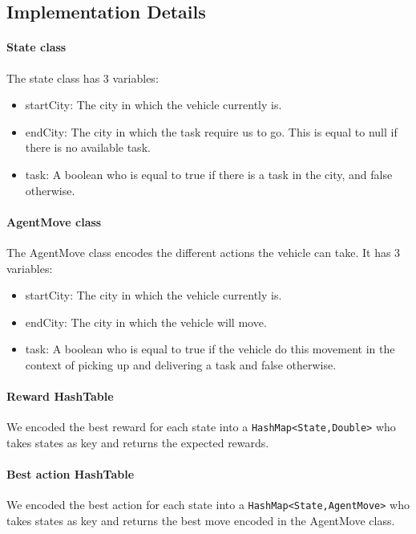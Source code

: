 \documentclass[11pt]{article}
\begin{document}
\subsection{Implementation Details}
\paragraph{State class} The state class has 3 variables:
\begin{itemize}
  \item startCity: The city in which the vehicle currently is.  
  \item endCity: The city in which the task require us to go. This is equal to null if there is no available task.
  \item task: A boolean who is equal to true if there is a task in the city, and false otherwise.
\end{itemize}

\paragraph{AgentMove class} The AgentMove class encodes the different actions the vehicle can take. It has 3 variables:
\begin{itemize}
  \item startCity: The city in which the vehicle currently is.
  \item endCity: The city in which the vehicle will move.
  \item task: A boolean who is equal to true if the vehicle do this movement in the context of picking up and delivering a task and false otherwise.
\end{itemize}

\paragraph{Reward HashTable} We encoded the best reward for each state into a \lstinline{HashMap<State,Double>} who takes states as key and returns the expected rewards.

\paragraph{Best action HashTable} We encoded the best action for each state into a \lstinline{HashMap<State,AgentMove>} who takes states as key and returns the best move encoded in the AgentMove class.
\end{document}
